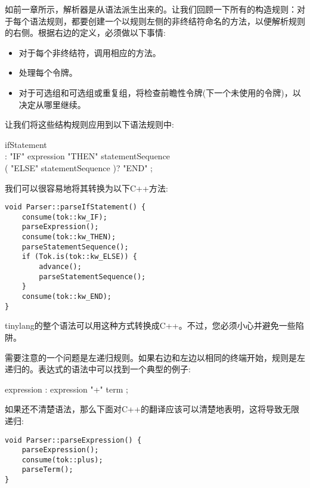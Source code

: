 如前一章所示，解析器是从语法派生出来的。让我们回顾一下所有的构造规则：对于每个语法规则，都要创建一个以规则左侧的非终结符命名的方法，以便解析规则的右侧。根据右边的定义，必须做以下事情:\par

\begin{itemize}
	\item 对于每个非终结符，调用相应的方法。
	\item 处理每个令牌。
	\item 对于可选组和可选组或重复组，将检查前瞻性令牌(下一个未使用的令牌)，以决定从哪里继续。
\end{itemize}

让我们将这些结构规则应用到以下语法规则中:\par

\begin{tcolorbox}[colback=white,colframe=black]
ifStatement \\
\hspace*{0.5cm}: "IF" expression "THEN" statementSequence \\
\hspace*{1cm}( "ELSE" statementSequence )? "END" ;
\end{tcolorbox}

我们可以很容易地将其转换为以下C++方法:\par

\begin{lstlisting}[caption={}]
void Parser::parseIfStatement() {
	consume(tok::kw_IF);
	parseExpression();
	consume(tok::kw_THEN);
	parseStatementSequence();
	if (Tok.is(tok::kw_ELSE)) {
		advance();
		parseStatementSequence();
	}
	consume(tok::kw_END);
}
\end{lstlisting}

tinylang的整个语法可以用这种方式转换成C++。不过，您必须小心并避免一些陷阱。\par

需要注意的一个问题是左递归规则。如果右边和左边以相同的终端开始，规则是左递归的。表达式的语法中可以找到一个典型的例子:\par

\begin{tcolorbox}[colback=white,colframe=black]
expression : expression "+" term ;
\end{tcolorbox}

如果还不清楚语法，那么下面对C++的翻译应该可以清楚地表明，这将导致无限递归:\par

\begin{lstlisting}[caption={}]
void Parser::parseExpression() {
	parseExpression();
	consume(tok::plus);
	parseTerm();
}
\end{lstlisting}

